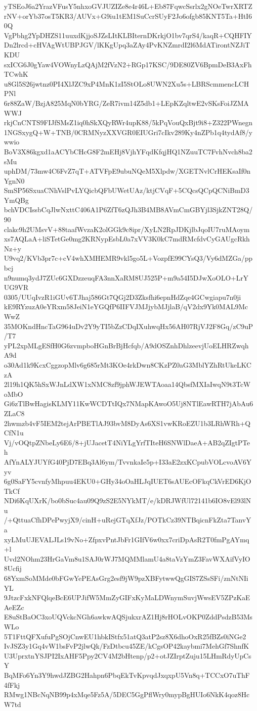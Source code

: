 yTSEoJ6a2YrazVFusY5nhxoGVJUZIZe8e4r46L+Eb87FqwcSsrlx2gNOeTwrXRTZ
rNV+orYb37osT5KR3/AUVx+G9iu1tEM1SuCcrSUyF2Jo6ofgb85KNT5Ta+HtI60Q
VgPbhg2YpDHZS11uuxdKjjoSJZsLItKLBIternDKrkjO1bv7qrS4/kaqR+CQHFIY
Dn2lrcd+cHVAgWtUBPJGV/lKKgUpq3aZAy4PvKNZmrdI2l6MdATirontNZJiTKDU
sxICG6J0gYaw4VOWnyLzQAjM2fVzN2+RGp17KSC/9DE80ZV6BpmDeB3AxFhTCwhK
u8Gl5S26jwtnz0PI4XlJZC9xP4MnK1zI5StOLo8UWN2Xu5s+LBRScmmencLCHPNl
6r88ZaW/BzjA825MqN0bYRG/ZeR7ivm14Z5db1+LEpKZqltwE2vSKsFoiJZMAWWJ
rkjCnCNTS9FIJfSMsZ1iq0hSkXQyRWr4upK88/5kPqVouQxBjt9i8+Z322PWnegn
1NGSxygQ+W+TNB/0CRMNyzXXVGR0EIUGri7cIkv289Ky4nZPb1q4tydAf8/ywwio
BoV3X86kgxd1aACYbCHcG8F2mEHj8VjhYFqdKfqjHQ1NZuuTC7FvhNvch8ba2sMu
uphDM/73mw4C6FvZ7qT+ATVFpE9ubuNQeM5Xlpdw/XGETNvlCrHEKsaIf0nYgnN0
SmSP56SxuaCNhVslPvLYQicbQFbUWetUAz/ktjCVqF+5CQcsQCpQCNiBmD3YmQBg
bchVDCIssbCqJlwNxttC406A1P6ZfT6zQJh3B4MB8AVmCmGBYjl3SjkZNT28Q/90
clakc9h2UMsvV+88taafWvzaK2olGGk9c8ipr/XyLN2RpJDKjlbJqoIU7ruMAoym
xs7AQLaA+liSTetGe0mg2KRNypEsbL0a7xVV3K0kC7mdRMcfdvCyGAUgcRkhNz+y
U9vq2/KVb3pr7c+cV4whXMHEMR9vkl5go5L+VozpfE99CYsQ3/Vy6dMZGa/ppbcj
n9numq3ydJ7ZUc6GXDzzeuqFA3nnXaRM8UJ525P+m9a54I5DJwXoOLO+LrYUG9VR
0305/UUqIvzR1iGUv6TJhaj586Gt7QGj2D3Zksfhi6epnHdZqe4GCwgiapu7n0ji
kE9RYzuzA0eYRxm58JeiN1eYGQfP6IIFVJMJjybMJjlaB/qV2dx9Yk0MAL9McWwZ
35MOKndHncTaG964uDv2Y9yTI5bZzCDqIXuhwqHx56AH07RjVJ2F8Gq/zC9uP/T7
yPL2xpMLgESfH0G6zvmpboHGnBrBjHcfqb/A9dOSZnhDhlzeevjUoELHRZwqhA9d
o30Ad1k9KcxCggzopMlv6g685rMt3KOe4rkDwn8CKzPZ0aG3MblYZhRtUkeLKCzA
2l19h1QK5hSxWJnLdXW1xNMC8zf9jphWJEWTAoaa14QbsfMXIaIwqN9t3TcWoMbO
Gi6zTlBwHagisKLMY11KwWCDTtIQx7NMapKAwoO5Uj8NTlEawRTH7jAbAu6ZLaC8
2hwmzb4vF5IEM2tejArPBETlAJ93bvM8DyAs6XS1vwKRoEZU1b3LRhWRh+QCfN1u
Vj/vOQtpZNbeLy6E6/8+jUJacetT4NiYLgYrfTIteH6SNWlDaeA+AB2qZIgtPTeh
AfYnALYJUYfG40PjD7EBq3Al6ym/TvvnkaIe5p+I33aE2zxKCpubVOLcvoAV6Yyv
6g0SaFY5cvnfyMhpuu4EKU0+GHy34oOaHLJqIUET6sAUEcOFkqCkVrED6KjOTkCf
NDi6KqUXrK/bo0bSuc4au09Q9zS2E5NYkMT/e/kDRJWfUl72141b6IO8vEl93lNu
/+QttuaCfhDPePwyjX9/cinH+uRejGTqXfJz/POTkCz39NTBqicnFkZta7TanvYa
xyLMuUJEVALJLs19vNo+ZfpxvPntJbFr1GIfV6w0xx7criDpAsR2T0fmPgAYmq+l
Uvd2NOhm23HrGaVm8u1SAJ0rWJ7MQMMlamU4a8taVzYmZ3FavWXAifVyIO8Ucfij
68YxmSoMMde0bFGwYePEAsGrg2esf9jW9pzXBFytwwQgGIS7ZSsSFi/znNtNIiYL
9JtzcFxkNFQlqeBcE6UPJifW5MmZyGIFxKyMaLDWnymSuvjWwsEV5ZPzKaEAeEZc
E8uStBaOC3xoUQVckcNGh6awkwAQSjukxrAZ1Hj8rHOLvOKP0ZddPsdzB53MsWLo
5T1FttQFXufuPgSOjCnwEU1hbkIStfx51atQ3atP2sz8X6dhoOxR25fBZs0iNGe2
IvJSZ3y1Gq4vW1bsFvP2jlwQk/FzDtbcu45ZE/kCgsOP42kaybmi7MehGf7ShnfK
U3UprxtnYSJPI2IxAHF5Ppy2CV4M2bHtenp/p2+otJZIrptZuju15LHmRdyUpCsY
BqMFo6Yn3Y9hwdJZBG2Hahpn6PbqEkTvKpvqdJxqxpU5Vn8q+TCCxO7uThF4fFkj
RMwg1NBcNqNB99p4xMqe5Fz5A/5DEC5GgPflWry0mypBgHUIo6NkK4qoz8HcW7td
